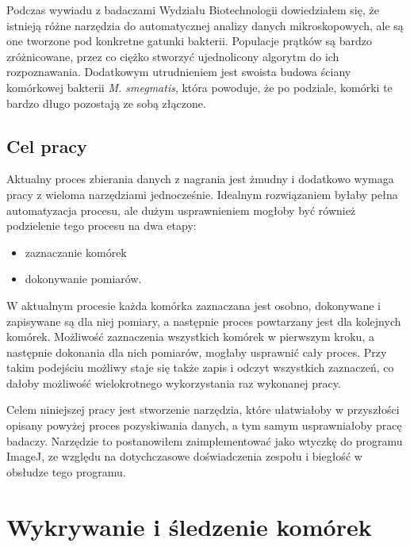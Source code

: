 \documentclass[declaration,shortabstract,mgr]{iithesis}
\begin{document}
Podczas wywiadu z badaczami Wydziału Biotechnologii dowiedziałem się, że istnieją różne narzędzia do automatycznej analizy danych mikroskopowych, ale są one tworzone pod konkretne gatunki bakterii.
Populacje prątków są bardzo zróżnicowane, przez co ciężko stworzyć ujednolicony algorytm do ich rozpoznawania.
Dodatkowym utrudnieniem jest swoista budowa ściany komórkowej bakterii \emph{M. smegmatis}, która powoduje, że po podziale, komórki te bardzo długo pozostają ze sobą złączone.

\section{Cel pracy}
\label{sec:target}

Aktualny proces zbierania danych z nagrania jest żmudny i dodatkowo wymaga pracy z wieloma narzędziami jednocześnie.
Idealnym rozwiązaniem byłaby pełna automatyzacja procesu, ale dużym usprawnieniem mogłoby być również podzielenie tego procesu na dwa etapy:
\begin{itemize}
  \item zaznaczanie komórek
  \item dokonywanie pomiarów.
\end{itemize}
W aktualnym procesie każda komórka zaznaczana jest osobno, dokonywane i zapisywane są dla niej pomiary, a następnie proces powtarzany jest dla kolejnych komórek.
Możliwość zaznaczenia wszystkich komórek w pierwszym kroku, a następnie dokonania dla nich pomiarów, mogłaby usprawnić cały proces.
Przy takim podejściu możliwy staje się także zapis i odczyt wszystkich zaznaczeń, co dałoby możliwość wielokrotnego wykorzystania raz wykonanej pracy.

Celem niniejszej pracy jest stworzenie narzędzia, które ułatwiałoby w przyszłości opisany powyżej proces pozyskiwania danych, a tym samym usprawniałoby pracę badaczy.
Narzędzie to postanowiłem zaimplementować jako wtyczkę do programu ImageJ, ze względu na dotychczasowe doświadczenia zespołu i biegłość w obsłudze tego programu.



\chapter{Wykrywanie i śledzenie komórek}
\label{cha:detection-and-tracking}

\end{document}
